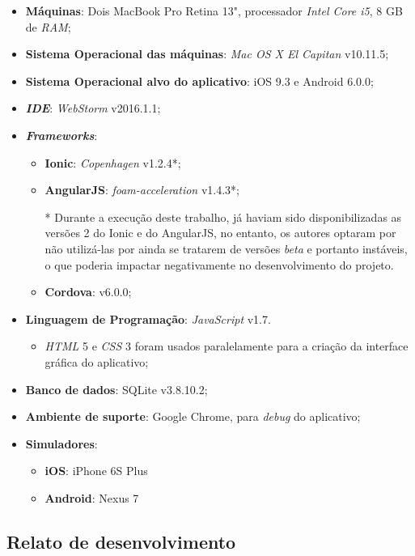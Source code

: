 \begin{itemize}
    \item \textbf{Máquinas}: Dois MacBook Pro Retina 13", processador \textit{Intel Core i5}, 8 GB de \textit{RAM};
    \item \textbf{Sistema Operacional das máquinas}: \textit{Mac OS X El Capitan} v10.11.5;
    \item \textbf{Sistema Operacional alvo do aplicativo}: iOS 9.3 e Android 6.0.0;
    \item \textbf{\textit{IDE}}: \textit{WebStorm} v2016.1.1;
    \item \textbf{\textit{Frameworks}}:
    \begin{itemize}
        \item \textbf{Ionic}: \textit{Copenhagen} v1.2.4*;
        \item \textbf{AngularJS}: \textit{foam-acceleration} v1.4.3*;
        
        * Durante a execução deste trabalho, já haviam sido disponibilizadas as versões 2 do Ionic e do AngularJS, no entanto,
        os autores optaram por não utilizá-las por ainda se tratarem de versões \textit{beta} e portanto instáveis, o que poderia 
        impactar negativamente no desenvolvimento do projeto.
        
        \item \textbf{Cordova}: v6.0.0;
    \end{itemize}
    \item \textbf{Linguagem de Programação}: \textit{JavaScript} v1.7. 
    \begin{itemize}
        \item \textit{HTML} 5 e \textit{CSS} 3 foram usados paralelamente para a criação da interface gráfica do aplicativo;
    \end{itemize}
    \item \textbf{Banco de dados}: SQLite v3.8.10.2;
    \item \textbf{Ambiente de suporte}: Google Chrome, para \textit{debug} do aplicativo;
    \item \textbf{Simuladores}: 
    \begin{itemize}
        \item \textbf{iOS}: iPhone 6S Plus
        \item \textbf{Android}: Nexus 7
    \end{itemize}
\end{itemize}

\subsection{Relato de desenvolvimento} \label{subsec:experienciasdev}


